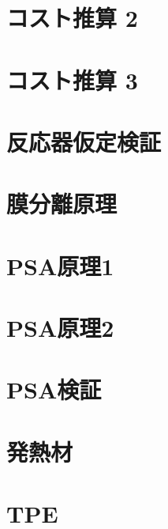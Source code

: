 \documentclass[
  11pt,
  aspectratio=43,           %
  dvipsnames,
]{beamer}
\begin{document}
\section{コスト推算 2}


\section{コスト推算 3}


\section{反応器仮定検証}


\section{膜分離原理}


\section{PSA原理1}


\section{PSA原理2}


\section{PSA検証}


\section{発熱材}


\section{TPE}

\end{document}
